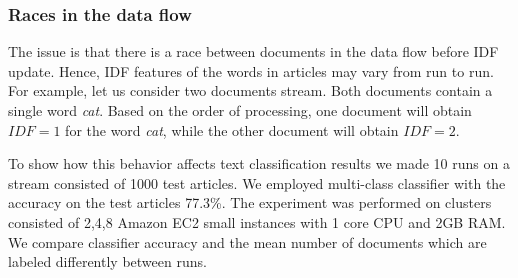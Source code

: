 \subsubsection{Races in the data flow}
The issue is that there is a race between documents in the data flow before IDF update. Hence, IDF features of the words in articles may vary from run to run. For example, let us consider two documents stream. Both documents contain a single word {\em cat}. Based on the order of processing, one document will obtain $IDF=1$ for the word {\em cat}, while the other document will obtain $IDF=2$.

To show how this behavior affects text classification results we made 10 runs on a stream consisted of 1000 test articles. We employed multi-class classifier with the accuracy on the test articles 77.3\%. The experiment was performed on clusters consisted of 2,4,8 Amazon EC2 small instances with 1 core CPU and 2GB RAM. We compare classifier accuracy and the mean number of documents which are labeled differently between runs.




